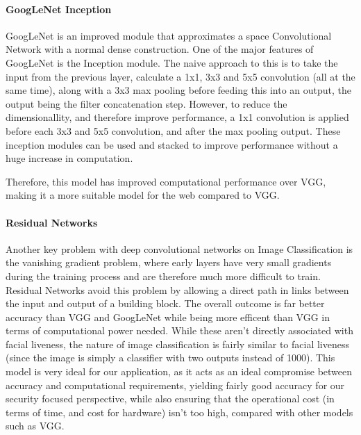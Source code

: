 \documentclass[11pt,a4paper]{article}
\begin{document}
        \paragraph{GoogLeNet Inception}
        GoogLeNet is an improved module that approximates a space Convolutional Network with a normal
        dense construction. One of the major features of GoogLeNet is the Inception module. The naive approach to this 
        is to take the input from the previous layer, calculate a 1x1, 3x3 and 5x5 convolution (all at the same time), along with
        a 3x3 max pooling before feeding this into an output, the output being the filter concatenation step.
        However, to reduce the dimensionallity, and therefore improve performance, a 1x1 convolution is applied before
        each 3x3 and 5x5 convolution, and after the max pooling output. These inception modules can be used and stacked
        to improve performance without a huge increase in computation. \cite{GoogLeNet} 
 
        Therefore, this model has improved computational performance over VGG, making it a more suitable model for the web compared to VGG. \cite{DeepNeuralNetworkDeployability}
        
        \paragraph{Residual Networks}
        Another key problem with deep convolutional networks on Image Classification is the vanishing gradient problem, where early layers have very small gradients during the training process and
        are therefore much more difficult to train. Residual Networks avoid this problem by allowing a direct path in links between the input and output of a building block.
        The overall outcome is far better accuracy than VGG and GoogLeNet while being more efficent than VGG in terms of computational power needed. \cite{DeepResidualNetworks}
        While these aren't directly associated with facial liveness, the nature of image classification is fairly similar to facial liveness (since the image is simply a classifier with two outputs instead of 1000).
        This model is very ideal for our application, as it acts as an ideal compromise between accuracy and computational requirements, yielding fairly good accuracy for our security focused perspective, while also
        ensuring that the operational cost (in terms of time, and cost for hardware) isn't too high, compared with other models such as VGG.
\end{document}
